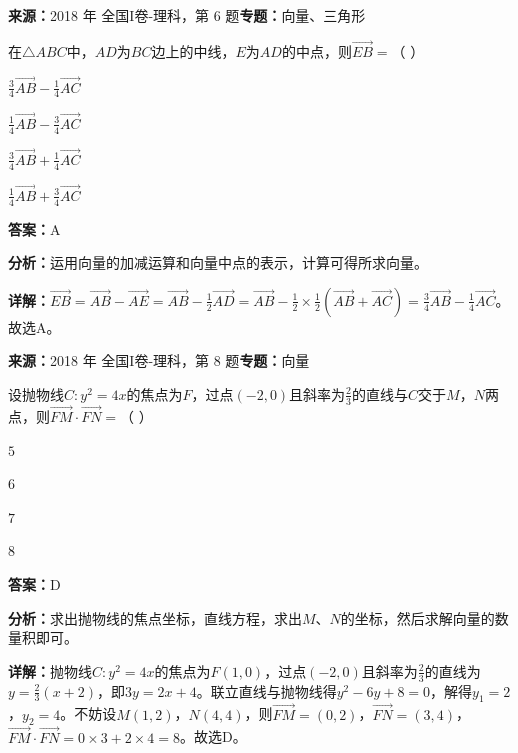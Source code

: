 \begin{question}[points=5]
\textbf{来源：}2018 年 全国I卷-理科，第 6 题\quad \textbf{专题：}向量、三角形\par
在$\triangle ABC$中，$AD$为$BC$边上的中线，$E$为$AD$的中点，则$\overrightarrow{EB}=$（    ）
\begin{choices}
  \item $\frac{3}{4}\overrightarrow{AB}-\frac{1}{4}\overrightarrow{AC}$
  \item $\frac{1}{4}\overrightarrow{AB}-\frac{3}{4}\overrightarrow{AC}$
  \item $\frac{3}{4}\overrightarrow{AB}+\frac{1}{4}\overrightarrow{AC}$
  \item $\frac{1}{4}\overrightarrow{AB}+\frac{3}{4}\overrightarrow{AC}$
\end{choices}
\begin{solution}
\textbf{答案：}A

\textbf{分析：}运用向量的加减运算和向量中点的表示，计算可得所求向量。

\textbf{详解：}$\overrightarrow{EB}=\overrightarrow{AB}-\overrightarrow{AE}=\overrightarrow{AB}-\frac{1}{2}\overrightarrow{AD}=\overrightarrow{AB}-\frac{1}{2}\times\frac{1}{2}(\overrightarrow{AB}+\overrightarrow{AC})=\frac{3}{4}\overrightarrow{AB}-\frac{1}{4}\overrightarrow{AC}$。故选A。
\end{solution}
\end{question}

\begin{question}[points=5]
\textbf{来源：}2018 年 全国I卷-理科，第 8 题\quad \textbf{专题：}向量\par
设抛物线$C:y^2=4x$的焦点为$F$，过点$(-2,0)$且斜率为$\frac{2}{3}$的直线与$C$交于$M$，$N$两点，则$\overrightarrow{FM}\cdot\overrightarrow{FN}=$（    ）
\begin{choices}
  \item $5$
  \item $6$
  \item $7$
  \item $8$
\end{choices}
\begin{solution}
\textbf{答案：}D

\textbf{分析：}求出抛物线的焦点坐标，直线方程，求出$M$、$N$的坐标，然后求解向量的数量积即可。

\textbf{详解：}抛物线$C:y^2=4x$的焦点为$F(1,0)$，过点$(-2,0)$且斜率为$\frac{2}{3}$的直线为$y=\frac{2}{3}(x+2)$，即$3y=2x+4$。联立直线与抛物线得$y^2-6y+8=0$，解得$y_1=2$，$y_2=4$。不妨设$M(1,2)$，$N(4,4)$，则$\overrightarrow{FM}=(0,2)$，$\overrightarrow{FN}=(3,4)$，$\overrightarrow{FM}\cdot\overrightarrow{FN}=0\times3+2\times4=8$。故选D。
\end{solution}
\end{question}

